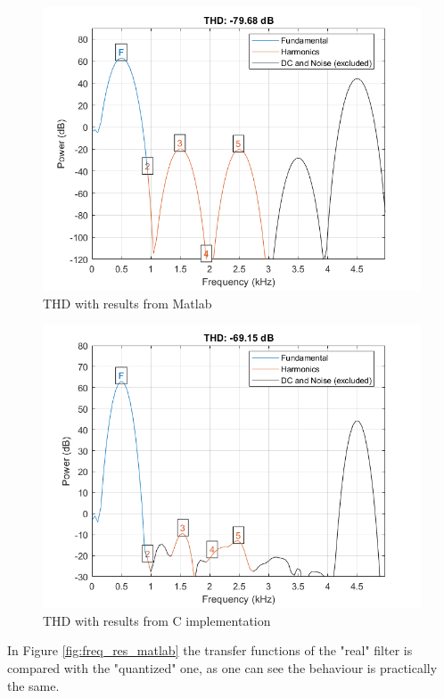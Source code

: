 \documentclass[a4paper, titlepage]{article}
\begin{document}
 \begin{figure} [h]
\centering
	\includegraphics[scale=0.6]{THD_matlab.png}
	\caption{THD with results from Matlab}
	\label{fig:thd_matlab}
\end{figure}
\newpage
 \begin{figure} [h]
\centering
	\includegraphics[scale=0.6]{THD_C.png}
	\caption{THD with results from C implementation}
	\label{fig:thd_c}
\end{figure}
\noindent
In Figure \ref{fig:freq_res_matlab} the transfer functions of the "real" filter is compared with the "quantized" one, as one can see the behaviour is practically the same.
\end{document}
